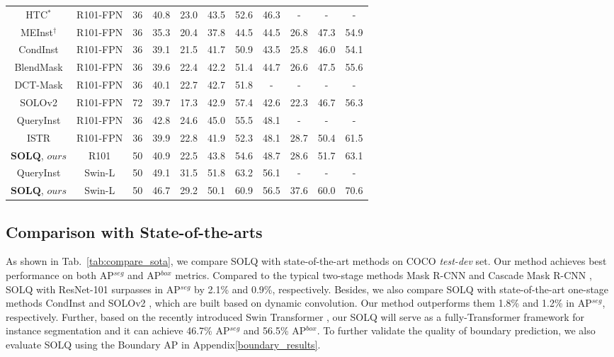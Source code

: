\documentclass{article}
\begin{document}
\begin{table*}[h]
{{\begin{tabular}{c|c|c|cccc|cccc}
HTC$^{*}$ \cite{chen2019hybrid} & R101-FPN & 36 & 40.8 & 23.0 & 43.5 & 52.6 & 46.3 & - & - & - \\
MEInst$^{\dagger}$ \cite{zhang2020meinst} & R101-FPN & 36 & 35.3 & 20.4 & 37.8 & 44.5 & 44.5 & 26.8 & 47.3 & 54.9 \\
CondInst \cite{tian2020conditional} & R101-FPN & 36 & 39.1 & 21.5 & 41.7 & 50.9 & 43.5 & 25.8 & 46.0 & 54.1 \\
BlendMask \cite{chen2020blendmask} & R101-FPN & 36 & 39.6 & 22.4 & 42.2 & 51.4 & 44.7 & 26.6 & 47.5 & 55.6 \\
DCT-Mask \cite{shen2020dct} & R101-FPN & 36 & 40.1 & 22.7 & 42.7 & 51.8 & - & - & - & - \\
SOLOv2 \cite{wang2020solov2} & R101-FPN & 72 & 39.7 & 17.3 & 42.9 & 57.4 & 42.6 & 22.3 & 46.7 & 56.3 \\
QueryInst \cite{queryinst2021} & R101-FPN & 36 & 42.8 & 24.6 & 45.0 & 55.5 & 48.1 & - & - & - \\
ISTR \cite{hu2021istr} & R101-FPN & 36 & 39.9 & 22.8 & 41.9 & 52.3 & 48.1 & 28.7 & 50.4 & 61.5 \\
\hline
{$\mathrm{\textbf{SOLQ}}$, $ours$} & R101 & 50 & 40.9 & 22.5 & 43.8 & 54.6 & 48.7 & 28.6 & 51.7 & 63.1 \\
\hline\hline
QueryInst \cite{queryinst2021} & Swin-L & 50 & 49.1 & 31.5 & 51.8 & 63.2 & 56.1 & - & - & - \\
{$\mathrm{\textbf{SOLQ}}$, $ours$} & Swin-L & 50 & 46.7 & 29.2 & 50.1 & 60.9 & 56.5 & 37.6 & 60.0 & 70.6 \\
\hline
\end{tabular}
}
}
\label{tab:compare_sota}
\end{table*}


\subsection{Comparison with State-of-the-arts}
As shown in Tab.~\ref{tab:compare_sota}, we compare SOLQ with state-of-the-art methods on COCO \textit{test-dev} set. Our method achieves best performance on both AP$^{seg}$ and AP$^{box}$ metrics. Compared to the typical two-stage methods Mask R-CNN \cite{he2017maskrcnn} and Cascade Mask R-CNN \cite{cai2018cascade}, SOLQ with ResNet-101 surpasses in AP$^{seg}$ by 2.1\% and 0.9\%, respectively. Besides, we also compare SOLQ with state-of-the-art one-stage methods CondInst \cite{tian2020conditional} and SOLOv2 \cite{wang2020solov2}, which are built based on dynamic convolution. Our method outperforms them 1.8\% and 1.2\% in AP$^{seg}$, respectively. Further, based on the recently introduced Swin Transformer \cite{liu2021swin}, our SOLQ will serve as a fully-Transformer framework for instance segmentation and it can achieve 46.7\% AP$^{seg}$ and 56.5\% AP$^{box}$. To further validate the quality of boundary prediction, we also evaluate SOLQ using the Boundary AP \cite{cheng2021boundaryiou} in Appendix\ref{boundary_results}.
\end{document}
